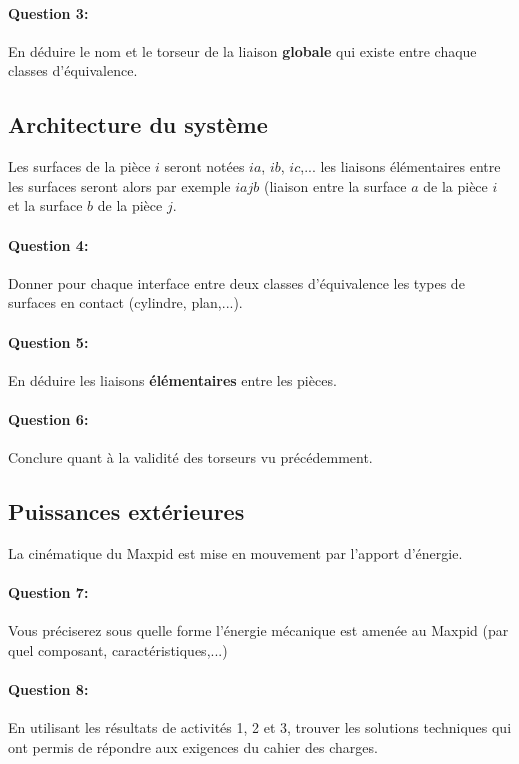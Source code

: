 \paragraph{Question 3:} En déduire le nom et le torseur de la liaison \textbf{globale} qui existe entre chaque classes d'équivalence.

\subsection{Architecture du système}

Les surfaces de la pièce $i$ seront notées $ia$, $ib$, $ic$,... les liaisons élémentaires entre les surfaces seront alors par exemple $iajb$ (liaison entre la surface $a$ de la pièce $i$ et la surface $b$ de la pièce $j$.

\paragraph{Question 4:} Donner pour chaque interface entre deux classes d'équivalence les types de surfaces en contact (cylindre, plan,...).

\paragraph{Question 5:} En déduire les liaisons \textbf{élémentaires} entre les pièces.

\paragraph{Question 6:} Conclure quant à la validité des torseurs vu précédemment.

\subsection{Puissances extérieures}

La cinématique du Maxpid est mise en mouvement par l'apport d'énergie.

\paragraph{Question 7:} Vous préciserez sous quelle forme l'énergie mécanique est amenée au Maxpid (par quel composant, caractéristiques,...)

\paragraph{Question 8:} En utilisant les résultats de activités 1, 2 et 3, trouver les solutions techniques qui ont permis de répondre aux exigences du cahier des charges.

